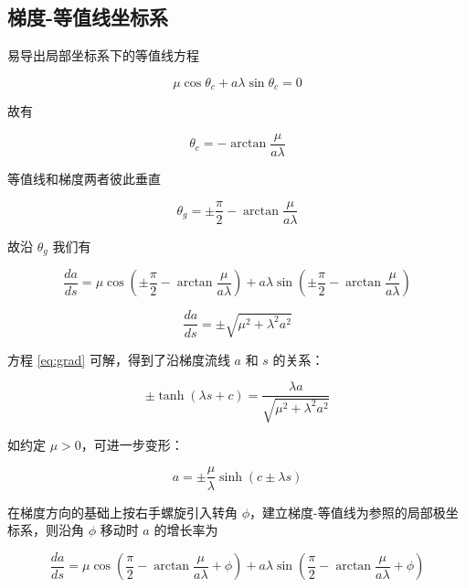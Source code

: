\documentclass[a4paper,12pt]{article}
\numberwithin{problem}{section}
\numberwithin{definition}{section}
\numberwithin{lemma}{section}
\numberwithin{proposition}{section}
\numberwithin{theorem}{section}
\numberwithin{grammar}{section}
\numberwithin{program}{section}
\numberwithin{convention}{section}
\numberwithin{corollary}{section}
\begin{document}
\subsection{梯度-等值线坐标系}

易导出局部坐标系下的等值线方程

\begin{equation}
    \mu \cos \theta_c + a \lambda \sin \theta_c = 0
\end{equation}

故有

\begin{equation}
    \theta_c = - \arctan \frac{\mu}{a \lambda}
\end{equation}

等值线和梯度两者彼此垂直

\begin{equation}
    \theta_g = \pm \frac{\pi}{2} - \arctan \frac{\mu}{a \lambda}
\end{equation}

故沿 $\theta_g$ 我们有

\begin{equation}
    \frac{da}{ds} = \mu \cos (\pm \frac{\pi}{2} - \arctan \frac{\mu}{a \lambda}) + a \lambda \sin (\pm \frac{\pi}{2} - \arctan \frac{\mu}{a \lambda})
\end{equation}

\begin{equation}
    \frac{da}{ds} = \pm \sqrt{\mu^2 + \lambda^2 a^2}\label{eq:grad}
\end{equation}

方程 \eqref{eq:grad} 可解，得到了沿梯度流线 $a$ 和 $s$ 的关系：

\begin{equation}
    \pm \tanh(\lambda s + c) = \frac{\lambda a}{\sqrt{\mu^2 + \lambda^2 a^2}}
\end{equation}

如约定 $\mu > 0$，可进一步变形：

\begin{equation}
  a = \pm \frac{\mu}{\lambda} \sinh(c \pm \lambda s)\label{eq:gradevo}
\end{equation}

在梯度方向的基础上按右手螺旋引入转角 $\phi$，建立梯度-等值线为参照的局部极坐标系，则沿角 $\phi$ 移动时 $a$ 的增长率为

\begin{equation}
    \frac{da}{ds} = \mu \cos (\frac{\pi}{2} - \arctan \frac{\mu}{a \lambda} + \phi) + a \lambda \sin (\frac{\pi}{2} - \arctan \frac{\mu}{a \lambda} + \phi)
    \label{eq:fourfold}
\end{equation}
\end{document}
